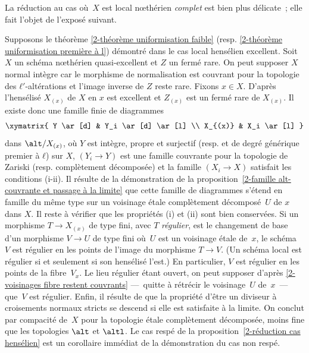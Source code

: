 \documentclass[10pt]{../fichiers-configuration-latex/smfart}
\begin{document}
La réduction au cas où $X$ est local nœthérien \emph{complet}
est bien plus délicate ; elle fait l'objet de l'exposé suivant.

\begin{démo}
Supposons le théorème \ref{2-théorème uniformisation faible}
(resp. \ref{2-théorème uniformisation première à l})
démontré dans le cas local hensélien excellent.
Soit $X$ un schéma nœthérien quasi-excellent et $Z$ un fermé rare.
On peut supposer $X$ normal intègre car le morphisme de normalisation est couvrant
pour la topologie des $ℓ'$-altérations et l'image inverse de $Z$ reste
rare. Fixons $x∈X$. D'après  l'hensélisé
$X_{(x)}$ de $X$ en $x$ est excellent et $Z_{(x)}$ est un fermé
rare de $X_{(x)}$. Il existe donc une famille finie 
de diagrammes
$$
\xymatrix{
Y \ar[d] & Y_i \ar[d] \ar[l] \\
X_{(x)} & X_i \ar[l]
}
$$
dans $\alt/X_{(x)}$, où $Y$ est intègre, propre et surjectif 
(resp. et de degré générique premier à $ℓ$) sur $X$, 
$(Y_i→Y)$ est une famille couvrante pour la topologie
de Zariski (resp. complètement décomposée) et la famille $(X_i→X)$
satisfait les conditions (i-ii).
Il résulte de la démonstration de la proposition \ref{2-famille alt-couvrante et passage à la limite}
que cette famille de diagrammes s'étend en
famille du même type sur un voisinage étale complètement
décomposé $U$ de $x$ dans $X$.
Il reste à vérifier que les propriétés (i) et (ii) sont bien
conservées. Si un morphisme $T→X_{(x)}$ de type fini,
avec $T$ \emph{régulier}, est le changement de base d'un morphisme
$V→U$ de type fini où $U$ est un voisinage étale de $x$,
le schéma $V$ est régulier en les points de l'image du morphisme
$T→V$. (Un schéma local est régulier si et seulement si son hensélisé
l'est.) En particulier, $V$ est régulier en les points de la
fibre $V_x$. Le lieu régulier étant ouvert, on peut supposer
d'après \ref{2-voisinages fibre restent couvrants} — quitte à
rétrécir le voisinage $U$ de $x$ — que $V$ est régulier.
Enfin, il résulte de  que la propriété d'être
un diviseur à croisements normaux stricts se descend si elle est satisfaite à la limite. 
On conclut par compacité de $X$ pour la topologie étale
complètement décomposée, moins fine que les topologies
$\alt$ et $\altl$. Le cas respé de la proposition \ref{2-réduction cas hensélien}
est un corollaire immédiat de la démonstration du cas non respé.
\end{démo}

\ifx\danslelivre\undefined


\end{document}
